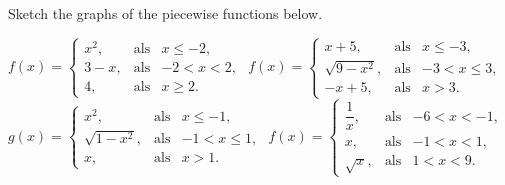  \begin{Exercise}[label = oef_stuksgewijs_grafiek_NL] Sketch the graphs of the piecewise functions below. 
	\begin{multicols}{2}
    	\Question[difficulty = 1] $f(x)= \left\{\begin{array}{rcl} x^2, & \mbox{als} & x\leq -2, \\ 3-x,  & \mbox{als} & -2 < x < 2, \\ 4,  & \mbox{als} & x \geq 2.  \end{array}\right.$
    	\Question[difficulty = 1] $f(x)= \left\{\begin{array}{rcl} x+5, & \mbox{als} & x\leq -3, \\ \sqrt{9-x^2},  & \mbox{als} & -3 < x\leq 3, \\ -x+5,  & \mbox{als} & x > 3.  \end{array}\right.$
    	\Question[difficulty = 1] $g(x)= \left\{\begin{array}{rcl} x^2, & \mbox{als} & x\leq -1, \\ \sqrt{1-x^2},   & \mbox{als} & -1 < x\leq 1, \\ x,  & \mbox{als} & x >1. \end{array}\right.$
    	\Question[difficulty = 1] $f(x)= \left\{\begin{array}{rcl} \dfrac{1}{x}, & \mbox{als} & -6 < x < -1, \\ x,  & \mbox{als} & -1 < x < 1, \\ \sqrt{x},  & \mbox{als} & 1 < x < 9.  \end{array}\right.$
    	\EndCurrentQuestion
	\end{multicols}
\end{Exercise}

